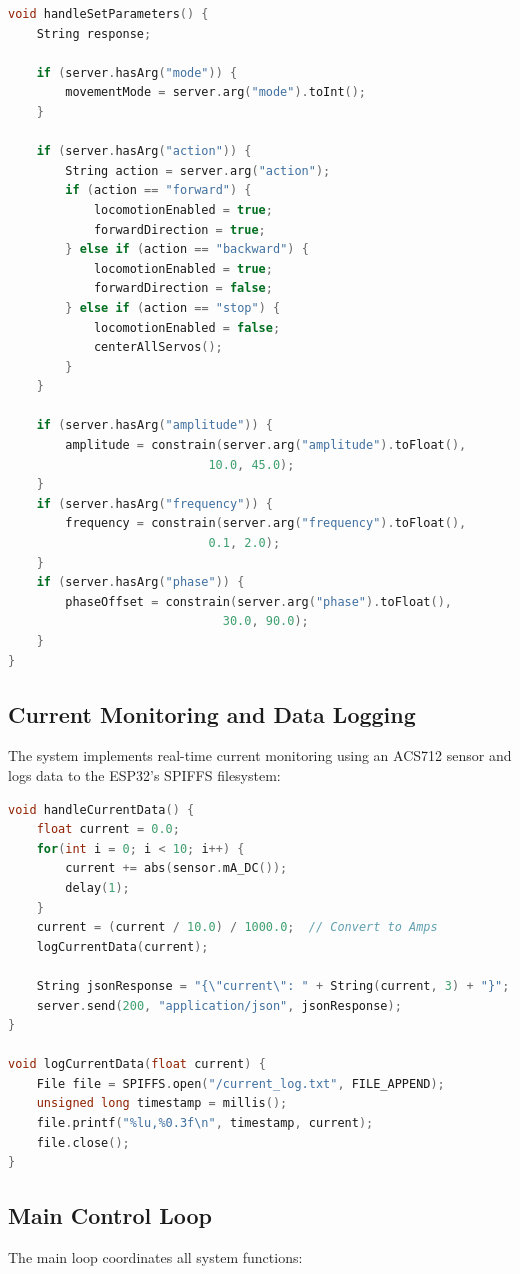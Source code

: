 \documentclass[12pt,a4paper]{report}
\begin{document}
\begin{lstlisting}[language=C++]
void handleSetParameters() {
    String response;
    
    if (server.hasArg("mode")) {
        movementMode = server.arg("mode").toInt();
    }
    
    if (server.hasArg("action")) {
        String action = server.arg("action");
        if (action == "forward") {
            locomotionEnabled = true;
            forwardDirection = true;
        } else if (action == "backward") {
            locomotionEnabled = true;
            forwardDirection = false;
        } else if (action == "stop") {
            locomotionEnabled = false;
            centerAllServos();
        }
    }

    if (server.hasArg("amplitude")) {
        amplitude = constrain(server.arg("amplitude").toFloat(), 
                            10.0, 45.0);
    }
    if (server.hasArg("frequency")) {
        frequency = constrain(server.arg("frequency").toFloat(), 
                            0.1, 2.0);
    }
    if (server.hasArg("phase")) {
        phaseOffset = constrain(server.arg("phase").toFloat(), 
                              30.0, 90.0);
    }
}
\end{lstlisting}

\subsection{Current Monitoring and Data Logging}
The system implements real-time current monitoring using an ACS712 sensor and logs data to the ESP32's SPIFFS filesystem:

\begin{lstlisting}[language=C++]
void handleCurrentData() {
    float current = 0.0;
    for(int i = 0; i < 10; i++) {
        current += abs(sensor.mA_DC());
        delay(1);
    }
    current = (current / 10.0) / 1000.0;  // Convert to Amps
    logCurrentData(current);
    
    String jsonResponse = "{\"current\": " + String(current, 3) + "}";
    server.send(200, "application/json", jsonResponse);
}

void logCurrentData(float current) {
    File file = SPIFFS.open("/current_log.txt", FILE_APPEND);
    unsigned long timestamp = millis();
    file.printf("%lu,%0.3f\n", timestamp, current);
    file.close();
}
\end{lstlisting}

\subsection{Main Control Loop}
The main loop coordinates all system functions:
\end{document}

